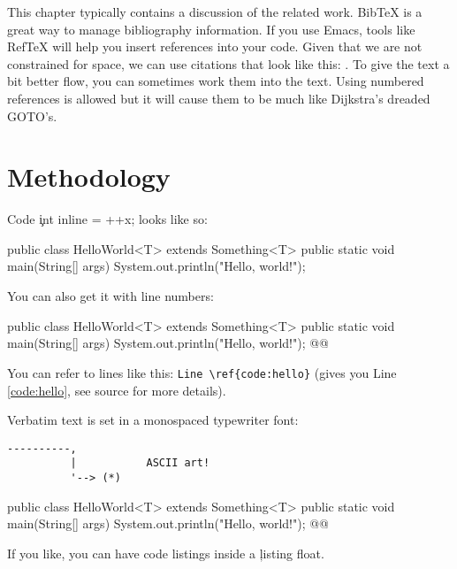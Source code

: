 This chapter typically contains a discussion of the related work.
BibTeX is a great way to manage bibliography information. If you
use Emacs, tools like RefTeX will help you insert references into
your code. Given that we are not constrained for space, we can use
citations that look like this: \citep{Acm_Curriculum_2013,
  CWE_193}. To give the text a bit better flow, you can sometimes
work them into the text. Using numbered references is allowed but
it will cause them to be much like Dijkstra's
\citeyearpar{Dijkstra_1968} dreaded GOTO's.

\chapter{Methodology}
\lipsum[1] Code \c{int inline = ++x;} looks like so:

\begin{Code}
public class HelloWorld<T> extends Something<T> {
  public static void main(String[] args) {
    System.out.println("Hello, world!");
  }
}
\end{Code}

You can also get it with line numbers:

\begin{Code_Numbered}
public class HelloWorld<T> extends Something<T> {
  public static void main(String[] args) {
    System.out.println("Hello, world!"); @\label{code:hello}@
  }
}
\end{Code_Numbered}


You can refer to lines like this: \verb+Line \ref{code:hello}+ (gives you Line \ref{code:hello}, see source for more details).

Verbatim text is set in a monospaced typewriter font:

\begin{verbatim}
----------,
          |           ASCII art!
          '--> (*)
\end{verbatim}

\lipsum[2-4]

\begin{listing*}[t]
\begin{Code_Numbered}
public class HelloWorld<T> extends Something<T> {
  public static void main(String[] args) {
    System.out.println("Hello, world!"); @\label{code:hello}@
  }
}
\end{Code_Numbered}
\caption{If you like, you can have code listings inside a \c{listing} float.}
\end{listing*}

